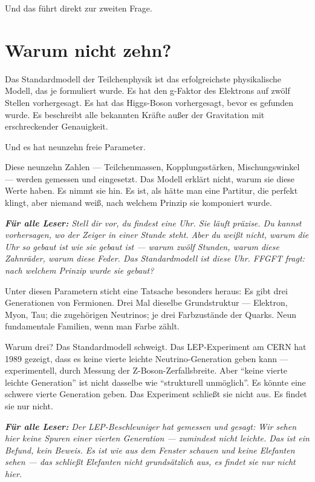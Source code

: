 \documentclass[11pt,oneside]{book}
\newenvironment{laierspur}{%
  \par\vspace{4pt}%
  \noindent\small\itshape\color{blue!60!black}%
  \textbf{Für alle Leser:}\enspace\ignorespaces}{%
  \par\vspace{4pt}\normalsize\normalfont\normalcolor}
\begin{document}
Und das führt direkt zur zweiten Frage.






\chapter{Warum nicht zehn?}

Das Standardmodell der Teilchenphysik ist das erfolgreichste physikalische
Modell, das je formuliert wurde. Es hat den g-Faktor des Elektrons auf zwölf
Stellen vorhergesagt. Es hat das Higgs-Boson vorhergesagt, bevor es gefunden
wurde. Es beschreibt alle bekannten Kräfte außer der Gravitation mit
erschreckender Genauigkeit.


Und es hat neunzehn freie Parameter.


Diese neunzehn Zahlen — Teilchenmassen, Kopplungsstärken, Mischungswinkel —
werden gemessen und eingesetzt. Das Modell erklärt nicht, warum sie diese
Werte haben. Es nimmt sie hin. Es ist, als hätte man eine Partitur, die
perfekt klingt, aber niemand weiß, nach welchem Prinzip sie komponiert wurde.


\begin{laierspur}
Stell dir vor, du findest eine Uhr. Sie läuft präzise. Du
kannst vorhersagen, wo der Zeiger in einer Stunde steht. Aber du weißt
nicht, warum die Uhr so gebaut ist wie sie gebaut ist — warum zwölf
Stunden, warum diese Zahnräder, warum diese Feder. Das Standardmodell ist
diese Uhr. FFGFT fragt: nach welchem Prinzip wurde sie gebaut?
\end{laierspur}

Unter diesen Parametern sticht eine Tatsache besonders heraus: Es gibt drei
Generationen von Fermionen. Drei Mal dieselbe Grundstruktur — Elektron,
Myon, Tau; die zugehörigen Neutrinos; je drei Farbzustände der Quarks. Neun
fundamentale Familien, wenn man Farbe zählt.


Warum drei? Das Standardmodell schweigt. Das LEP-Experiment am CERN hat 1989
gezeigt, dass es keine vierte leichte Neutrino-Generation geben kann —
experimentell, durch Messung der Z-Boson-Zerfallsbreite. Aber \enquote{keine vierte
leichte Generation} ist nicht dasselbe wie \enquote{strukturell unmöglich}. Es könnte
eine schwere vierte Generation geben. Das Experiment schließt sie nicht aus.
Es findet sie nur nicht.


\begin{laierspur}
Der LEP-Beschleuniger hat gemessen und gesagt: Wir sehen hier
keine Spuren einer vierten Generation — zumindest nicht leichte. Das ist
ein Befund, kein Beweis. Es ist wie aus dem Fenster schauen und keine
Elefanten sehen — das schließt Elefanten nicht grundsätzlich aus, es
findet sie nur nicht hier.
\end{laierspur}
\end{document}
